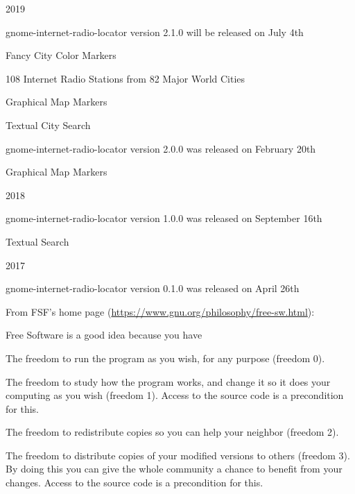 \documentclass[20pt,landscape]{foils}
\begin{document}
\begin{list1}
\item 2019
  \begin{list2}
  \item gnome-internet-radio-locator version 2.1.0 will be released on July 4th
    \begin{list3}
    \item Fancy City Color Markers   
    \item 108 Internet Radio Stations from 82 Major World Cities
    \item Graphical Map Markers
    \item Textual City Search
    \end{list3}
  \end{list2}
  \begin{list3}
    \item gnome-internet-radio-locator version 2.0.0 was released on February 20th
      \begin{list3}
      \item Graphical Map Markers
      \end{list3}
  \end{list3}
\item 2018
  \begin{list2}
    \item gnome-internet-radio-locator version 1.0.0 was released on September 16th
    \begin{list3}
      \item Textual Search
    \end{list3}
  \end{list2}
\item 2017
  \begin{list2}
    \item gnome-internet-radio-locator version 0.1.0 was released on April 26th
  \end{list2}
\end{list1}


From FSF's home page (\url{https://www.gnu.org/philosophy/free-sw.html}):

\begin{list1}
\item Free Software is a good idea because you have
  \begin{list2}
    \item The freedom to run the program as you wish, for any purpose (freedom 0).
    \item The freedom to study how the program works, and change it so it does your computing as you wish (freedom 1). Access to the source code is a precondition for this.
    \item The freedom to redistribute copies so you can help your neighbor (freedom 2).
    \item The freedom to distribute copies of your modified versions to others (freedom 3). By doing this you can give the whole community a chance to benefit from your changes. Access to the source code is a precondition for this.
  \end{list2}
\end{list1}
\end{document}
